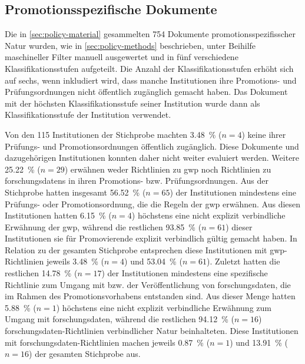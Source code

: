 \subsection{Promotionsspezifische Dokumente}\label{sec:policy-results-specific}
Die in \cref{sec:policy-material} gesammelten \num{754} Dokumente promotionsspezifisscher Natur wurden, wie in \cref{sec:policy-methods} beschrieben, unter Beihilfe maschineller Filter manuell ausgewertet und in fünf verschiedene Klassifikationsstufen aufgeteilt.
Die Anzahl der Klassifikationsstufen erhöht sich auf sechs, wenn inkludiert wird, dass manche Institutionen ihre Promotions- und Prüfungsordnungen nicht öffentlich zugänglich gemacht haben.
Das Dokument mit der höchsten Klassifikationsstufe seiner Institution wurde dann als Klassifikationsstufe der Institution verwendet.

Von den \num{115} Institutionen der Stichprobe machten \SI{3,48}{\percent} ($n=\num{4}$) keine ihrer Prüfungs- und Promotionsordnungen öffentlich zugänglich.
Diese Dokumente und dazugehörigen Institutionen konnten daher nicht weiter evaluiert werden.
Weitere \SI{25,22}{\percent} ($n=\num{29}$) erwähnen weder Richtlinien zu \gls{gwp} noch Richtlinien zu \glspl{forschungsdaten} in ihren Promotions- bzw. Prüfungsordnungen.
Aus der Stichprobe hatten insgesamt \SI{56,52}{\percent} ($n=\num{65}$) der Institutionen mindestens eine Prüfungs- oder Promotionsordnung, die die Regeln der \gls{gwp} erwähnen.
Aus diesen Institutionen hatten \SI{6,15}{\percent} ($n=\num{4}$) höchstens eine nicht explizit verbindliche Erwähnung der \gls{gwp}, während die restlichen \SI{93,85}{\percent} ($n=\num{61}$) dieser Institutionen sie für Promovierende explizit verbindlich gültig gemacht haben.
In Relation zu der gesamten Stichprobe entsprechen diese Institutionen mit \gls{gwp}-Richtlinien jeweils \SI{3,48}{\percent} ($n=\num{4}$) und \SI{53,04}{\percent} ($n=\num{61}$).
Zuletzt hatten die restlichen \SI{14,78}{\percent} ($n=\num{17}$) der Institutionen mindestens eine spezifische Richtlinie zum Umgang mit bzw. der Veröffentlichung von \gls{forschungsdaten}, die im Rahmen des Promotionsvorhabens entstanden sind.
Aus dieser Menge hatten \SI{5,88}{\percent} ($n=\num{1}$) höchstens eine nicht explizit verbindliche Erwähnung zum Umgang mit \gls{forschungsdaten}, während die restlichen \SI{94,12}{\percent} ($n=\num{16}$) \gls{forschungsdaten}-Richtlinien verbindlicher Natur beinhalteten.
Diese Institutionen mit \gls{forschungsdaten}-Richtlinien machen jeweils \SI{0,87}{\percent} ($n=\num{1}$) und \SI{13,91}{\percent} ($n=\num{16}$) der gesamten Stichprobe aus.
\pagebreak

